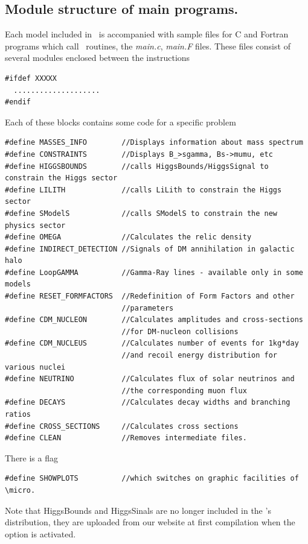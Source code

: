 \documentclass[12pt,a4paper]{article}
\begin{document}
\subsection{Module structure of main programs.}
Each model included in \micro\  is accompanied with sample files for
C and Fortran programs which call \micro\ routines, the {\it main.c}, {\it main.F} files.  
These files   consist of
several modules enclosed between the instructions
\begin{verbatim}
#ifdef XXXXX
  ....................
#endif
\end{verbatim}
Each of these blocks  contains some code for a specific problem
{\small
\begin{verbatim}
#define MASSES_INFO        //Displays information about mass spectrum 
#define CONSTRAINTS        //Displays B_>sgamma, Bs->mumu, etc
#define HIGGSBOUNDS        //calls HiggsBounds/HiggsSignal to constrain the Higgs sector
#define LILITH             //calls LiLith to constrain the Higgs sector
#define SModelS            //calls SModelS to constrain the new physics sector
#define OMEGA              //Calculates the relic density 
#define INDIRECT_DETECTION //Signals of DM annihilation in galactic halo
#define LoopGAMMA          //Gamma-Ray lines - available only in some models
#define RESET_FORMFACTORS  //Redefinition of Form Factors and other
                           //parameters 
#define CDM_NUCLEON        //Calculates amplitudes and cross-sections
                           //for DM-nucleon collisions 
#define CDM_NUCLEUS        //Calculates number of events for 1kg*day
                           //and recoil energy distribution for various nuclei
#define NEUTRINO           //Calculates flux of solar neutrinos and
                           //the corresponding muon flux 
#define DECAYS             //Calculates decay widths and branching ratios  
#define CROSS_SECTIONS     //Calculates cross sections 
#define CLEAN              //Removes intermediate files.
\end{verbatim}
}

There is a flag \\

\begin{verbatim}
#define SHOWPLOTS          //which switches on graphic facilities of \micro.
\end{verbatim}

Note that HiggsBounds and HiggsSinals are no longer included in the \micro's distribution, they are uploaded from our website at first compilation when the option is activated.  
\end{document}
